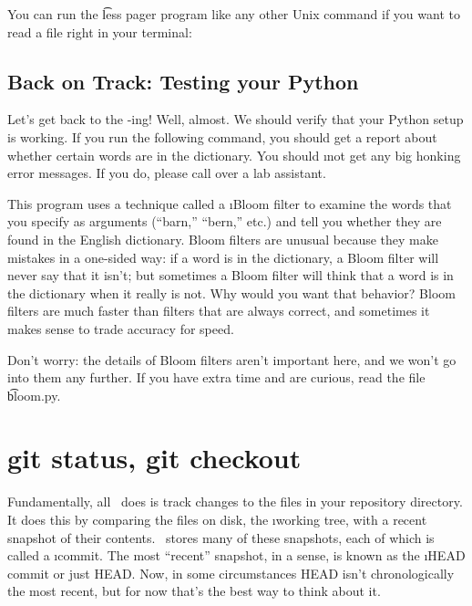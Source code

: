 \documentclass[letterpaper,12pt,titlepage,twoside]{article}
\begin{document}
You can run the \t{less} pager program like any other Unix command if you want
to read a file right in your terminal:


\subsection*{Back on Track: Testing your Python}

Let's get back to the \git-ing! Well, almost. We should verify that your
Python setup is working. If you run the following command, you should get a
report about whether certain words are in the dictionary. You should \i{not}
get any big honking error messages. If you do, please call over a lab
assistant.


This program uses a technique called a \i{Bloom filter} to examine the words
that you specify as arguments (``barn,'' ``bern,'' etc.) and tell you whether
they are found in the English dictionary. Bloom filters are unusual because
they make mistakes in a one-sided way: if a word is in the dictionary, a Bloom
filter will never say that it isn't; but sometimes a Bloom filter will think
that a word is in the dictionary when it really is not. Why would you want
that behavior? Bloom filters are much faster than filters that are always
correct, and sometimes it makes sense to trade accuracy for speed.

Don't worry: the details of Bloom filters aren't important here, and we won't
go into them any further. If you have extra time and are curious, read the
file \t{bloom.py}.


\section{git status, git checkout}

Fundamentally, all \git\ does is track changes to the files in your repository
directory. It does this by comparing the files on disk, the \i{working tree},
with a recent snapshot of their contents. \git\ stores many of these
snapshots, each of which is called a \i{commit}. The most ``recent'' snapshot,
in a sense, is known as the \i{HEAD} commit or just HEAD. Now, in some
circumstances HEAD isn't chronologically the most recent, but for now that's
the best way to think about it.
\end{document}

